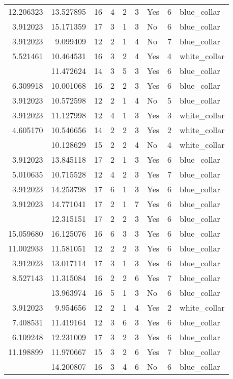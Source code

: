 \documentclass[
]{article}
\begin{document}
\begin{longtable}[t]{rrrrrllrl}
12.206323 & 13.527895 & 16 & 4 & 2 & 3 & Yes & 6 & blue\_collar\\
3.912023 & 15.171359 & 17 & 3 & 1 & 3 & No & 6 & blue\_collar\\
3.912023 & 9.099409 & 12 & 2 & 1 & 4 & No & 7 & blue\_collar\\
5.521461 & 10.464531 & 16 & 3 & 2 & 4 & Yes & 4 & white\_collar\\
\addlinespace
7.346010 & 11.472624 & 14 & 3 & 5 & 3 & Yes & 6 & blue\_collar\\
6.309918 & 10.001068 & 16 & 2 & 2 & 3 & Yes & 6 & blue\_collar\\
3.912023 & 10.572598 & 12 & 2 & 1 & 4 & No & 5 & blue\_collar\\
3.912023 & 11.127998 & 12 & 4 & 1 & 3 & Yes & 3 & white\_collar\\
4.605170 & 10.546656 & 14 & 2 & 2 & 3 & Yes & 2 & white\_collar\\
\addlinespace
6.956545 & 10.128629 & 15 & 2 & 2 & 4 & No & 4 & white\_collar\\
3.912023 & 13.845118 & 17 & 2 & 1 & 3 & Yes & 6 & blue\_collar\\
5.010635 & 10.715528 & 12 & 4 & 2 & 3 & Yes & 7 & blue\_collar\\
3.912023 & 14.253798 & 17 & 6 & 1 & 3 & Yes & 6 & blue\_collar\\
3.912023 & 14.771041 & 17 & 2 & 1 & 7 & Yes & 6 & blue\_collar\\
\addlinespace
11.590349 & 12.315151 & 17 & 2 & 2 & 3 & Yes & 6 & blue\_collar\\
15.059680 & 16.125076 & 16 & 6 & 3 & 3 & Yes & 6 & blue\_collar\\
11.002933 & 11.581051 & 12 & 2 & 2 & 3 & Yes & 6 & blue\_collar\\
3.912023 & 13.017114 & 17 & 3 & 1 & 3 & Yes & 6 & blue\_collar\\
8.527143 & 11.315084 & 16 & 2 & 2 & 6 & Yes & 7 & blue\_collar\\
\addlinespace
3.912023 & 13.963974 & 16 & 5 & 1 & 3 & No & 6 & blue\_collar\\
3.912023 & 9.954656 & 12 & 2 & 1 & 4 & Yes & 2 & white\_collar\\
7.408531 & 11.419164 & 12 & 3 & 6 & 3 & Yes & 6 & blue\_collar\\
6.109248 & 12.231009 & 17 & 3 & 2 & 3 & Yes & 6 & blue\_collar\\
11.198899 & 11.970667 & 15 & 3 & 2 & 6 & Yes & 7 & blue\_collar\\
\addlinespace
13.815561 & 14.200807 & 16 & 3 & 4 & 6 & No & 6 & blue\_collar\\

\end{longtable}
\end{document}
